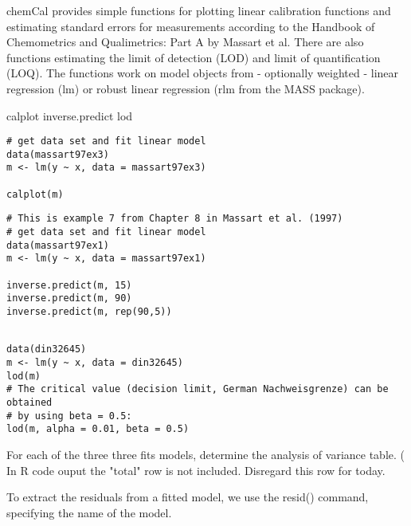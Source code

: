 chemCal provides simple functions for plotting linear calibration functions and estimating standard errors for measurements according to the Handbook of Chemometrics and Qualimetrics: Part A by Massart et al. There are also functions estimating the limit of detection (LOD) and limit of quantification (LOQ). The functions work on model objects from - optionally weighted - linear regression (lm) or robust linear regression (rlm from the MASS package).


calplot
inverse.predict
lod

\begin{framed}
\begin{verbatim}
# get data set and fit linear model
data(massart97ex3)
m <- lm(y ~ x, data = massart97ex3)

calplot(m)
\end{verbatim}
\end{framed}

\begin{framed}
\begin{verbatim}
# This is example 7 from Chapter 8 in Massart et al. (1997)
# get data set and fit linear model
data(massart97ex1)
m <- lm(y ~ x, data = massart97ex1)

inverse.predict(m, 15) 
inverse.predict(m, 90) 
inverse.predict(m, rep(90,5)) 

\end{verbatim}
\end{framed}


\begin{framed}
\begin{verbatim}

data(din32645)
m <- lm(y ~ x, data = din32645)
lod(m)
# The critical value (decision limit, German Nachweisgrenze) can be obtained
# by using beta = 0.5:
lod(m, alpha = 0.01, beta = 0.5)

\end{verbatim}
\end{framed}



For each of the three three fits models, determine the analysis of variance table.
( In R code ouput the "total" row is not included. Disregard this row for today.


To extract the residuals from a fitted model, we use the resid() command, specifying the name of the model.


